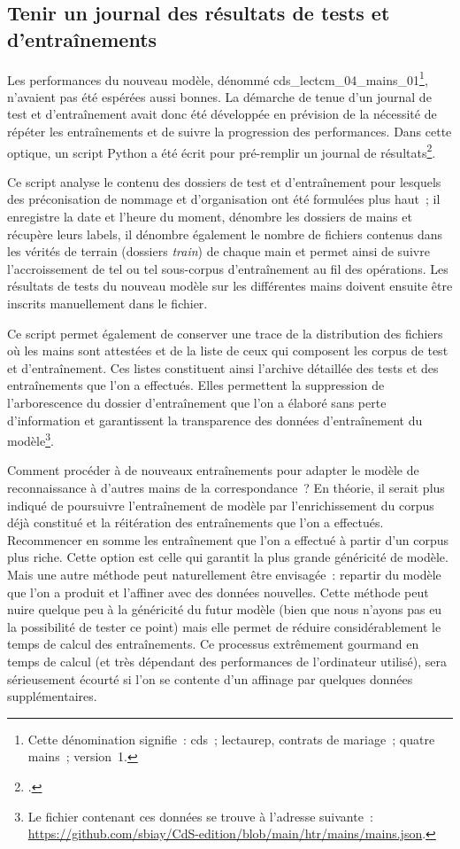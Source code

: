 \documentclass[a4paper,12pt,twoside]{book}
\begin{document}
			\subsection{Tenir un journal des résultats de tests et d'entraînements}
				\label{journal-test}
				Les performances du nouveau modèle, dénommé \textsf{cds\_lectcm\_04\_mains\_01}\footnote{Cette dénomination signifie~: \gls{cds}~; \gls{lectaurep}, contrats de mariage~; quatre mains~; version~1.}, n'avaient pas été espérées aussi bonnes. La démarche de tenue d'un journal de test et d'entraînement avait donc été développée en prévision de la nécessité de répéter les entraînements et de suivre la progression des performances. Dans cette optique, un script Python a été écrit pour pré-remplir un journal de résultats\footcite{biayJournalReconnPy2022}. 
				
				Ce script analyse le contenu des dossiers de test et d'entraînement pour lesquels des préconisation de nommage et d'organisation ont été formulées plus haut~; il enregistre la date et l'heure du moment, dénombre les dossiers de mains et récupère leurs labels, il dénombre également le nombre de fichiers contenus dans les vérités de terrain (dossiers \textit{train}) de chaque main et permet ainsi de suivre l'accroissement de tel ou tel sous-corpus d'entraînement au fil des opérations. Les résultats de tests du nouveau modèle sur les différentes mains doivent ensuite être inscrits manuellement dans le fichier.
				
				Ce script permet également de conserver une trace de la distribution des fichiers où les mains sont attestées et de la liste de ceux qui composent les corpus de test et d'entraînement. Ces listes constituent ainsi l'archive détaillée des tests et des entraînements que l'on a effectués. Elles permettent la suppression de l'arborescence du dossier d'entraînement que l'on a élaboré sans perte d'information et garantissent la transparence des données d'entraînement du modèle\footnote{Le fichier contenant ces données se trouve à l'adresse suivante~: \url{https://github.com/sbiay/CdS-edition/blob/main/htr/mains/mains.json}.}.
				
				Comment procéder à de nouveaux entraînements pour adapter le modèle de reconnaissance à d'autres mains de la correspondance~? En théorie, il serait plus indiqué de poursuivre l'entraînement de modèle par l'enrichissement du corpus déjà constitué et la réitération des entraînements que l'on a effectués. Recommencer en somme les entraînement que l'on a effectué à partir d'un corpus plus riche. Cette option est celle qui garantit la plus grande généricité de modèle. Mais une autre méthode peut naturellement être envisagée~: repartir du modèle que l'on a produit et l'affiner avec des données nouvelles. Cette méthode peut nuire quelque peu à la généricité du futur modèle (bien que nous n'ayons pas eu la possibilité de tester ce point) mais elle permet de réduire considérablement le temps de calcul des entraînements. Ce processus extrêmement gourmand en temps de calcul (et très dépendant des performances de l'ordinateur utilisé), sera sérieusement écourté si l'on se contente d'un affinage par quelques données supplémentaires.
							
\end{document}
